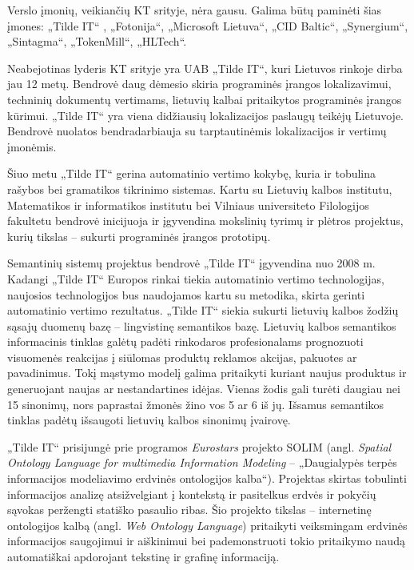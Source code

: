 \begin{multicols}{2}
Verslo įmonių, veikiančių KT srityje, nėra gausu. Galima būtų paminėti šias įmones: „Tilde IT“ , „Fotonija“, „Microsoft Lietuva“,  „CID Baltic“,  „Synergium“, „Sintagma“, „TokenMill“, „HLTech“.

    Neabejotinas lyderis KT srityje yra UAB „Tilde IT“, kuri Lietuvos rinkoje dirba jau 12 metų. Bendrovė daug dėmesio skiria programinės įrangos lokalizavimui, techninių dokumentų vertimams, lietuvių kalbai pritaikytos programinės įrangos kūrimui. „Tilde IT“ yra viena didžiausių lokalizacijos paslaugų teikėjų Lietuvoje. Bendrovė nuolatos bendradarbiauja su tarptautinėmis lokalizacijos ir vertimų įmonėmis.   

    Šiuo metu „Tilde IT“ gerina automatinio vertimo kokybę, kuria ir tobulina rašybos bei gramatikos tikrinimo sistemas. Kartu su Lietuvių kalbos institutu, Matematikos ir informatikos institutu bei Vilniaus universiteto Filologijos fakultetu bendrovė inicijuoja ir įgyvendina mokslinių tyrimų ir plėtros projektus, kurių tikslas – sukurti programinės įrangos prototipų.  

    Semantinių sistemų projektus bendrovė „Tilde IT“ įgyvendina nuo 2008 m. Kadangi „Tilde IT“ Europos rinkai tiekia automatinio vertimo technologijas, naujosios technologijos bus naudojamos kartu su metodika, skirta gerinti automatinio vertimo rezultatus. „Tilde IT“ siekia sukurti lietuvių kalbos žodžių sąsajų duomenų bazę – lingvistinę semantikos bazę. Lietuvių kalbos semantikos informacinis tinklas galėtų padėti rinkodaros profesionalams prognozuoti visuomenės reakcijas į siūlomas produktų reklamos akcijas, pakuotes ar pavadinimus. Tokį mąstymo modelį galima pritaikyti kuriant naujus produktus ir generuojant naujas ar nestandartines idėjas. Vienas žodis gali turėti daugiau nei 15 sinonimų, nors paprastai žmonės žino vos 5 ar 6 iš jų. Išsamus semantikos tinklas padėtų išsaugoti lietuvių kalbos sinonimų įvairovę.   

    „Tilde IT“ prisijungė prie programos \textit{Eurostars} projekto SOLIM (angl. \textit{Spatial Ontology Language for multimedia Information Modeling} – „Daugialypės terpės informacijos modeliavimo erdvinės ontologijos kalba“). Projektas skirtas tobulinti informacijos analizę atsižvelgiant į kontekstą ir pasitelkus erdvės ir pokyčių sąvokas peržengti statiško pasaulio ribas. Šio projekto tikslas – internetinę ontologijos kalbą (angl. \textit{Web Ontology Language}) pritaikyti veiksmingam erdvinės informacijos saugojimui ir aiškinimui bei pademonstruoti tokio pritaikymo naudą automatiškai apdorojant tekstinę ir grafinę informaciją.   


\end{multicols}
